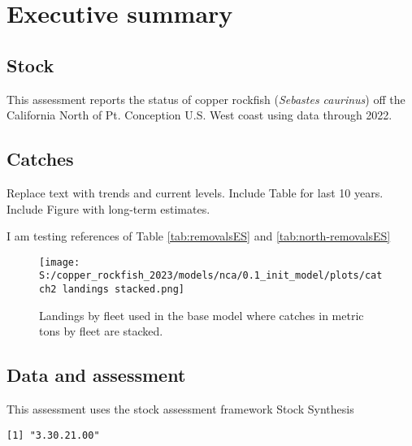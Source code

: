 \documentclass[11pt,
  english,
  letterpaper,
]{article}
\begin{document}
\newcommand{\lt}{\ensuremath <}
\newcommand{\gt}{\ensuremath >}

\hypertarget{executive-summary}{%
\section*{Executive summary}\label{executive-summary}}

\hypertarget{stock}{%
\subsection*{Stock}\label{stock}}

This assessment reports the status of copper rockfish (\emph{Sebastes caurinus}) off the California North of Pt. Conception U.S. West coast using data through 2022.

\hypertarget{catches}{%
\subsection*{Catches}\label{catches}}

Replace text with trends and current levels. Include Table for last 10 years. Include Figure with long-term estimates.

I am testing references of Table \ref{tab:removalsES} and \ref{tab:north-removalsES}





\begin{figure}
\centering
\texttt{[image: S:/copper\_rockfish\_2023/models/nca/0.1\_init\_model/plots/catch2 landings stacked.png]}
\caption{Landings by fleet used in the base model where catches in metric tons by fleet are stacked.\label{fig:es-catch}}
\end{figure}

\hypertarget{data-and-assessment}{%
\subsection*{Data and assessment}\label{data-and-assessment}}

This assessment uses the stock assessment framework Stock Synthesis

\begin{verbatim}
[1] "3.30.21.00"
\end{verbatim}
\end{document}

